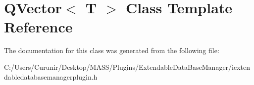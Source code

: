 \hypertarget{class_q_vector}{}\section{Q\+Vector$<$ T $>$ Class Template Reference}
\label{class_q_vector}


The documentation for this class was generated from the following file\+:\begin{DoxyCompactItemize}
\item 
C\+:/\+Users/\+Curunir/\+Desktop/\+M\+A\+S\+S/\+Plugins/\+Extendable\+Data\+Base\+Manager/iextendabledatabasemanagerplugin.\+h\end{DoxyCompactItemize}
